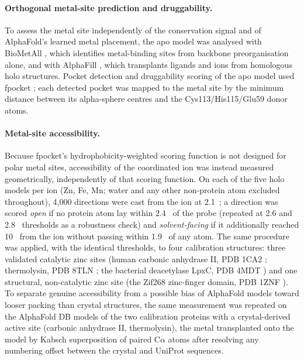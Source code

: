 \documentclass[11pt,a4paper]{article}
\newcommand{\ang}{\text{\AA}}
\begin{document}
\paragraph{Orthogonal metal-site prediction and druggability.} To assess the metal site independently of the conservation signal and of AlphaFold's learned metal placement, the apo model was analysed with BioMetAll \citep{sanchezaparicio2021biometall}, which identifies metal-binding sites from backbone preorganisation alone, and with AlphaFill \citep{hekkelman2023alphafill}, which transplants ligands and ions from homologous holo structures. Pocket detection and druggability scoring of the apo model used fpocket \citep{leguilloux2009fpocket}; each detected pocket was mapped to the metal site by the minimum distance between its alpha-sphere centres and the Cys113/His115/Glu59 donor atoms.

\paragraph{Metal-site accessibility.} Because fpocket's hydrophobicity-weighted scoring function is not designed for polar metal sites, accessibility of the coordinated ion was instead measured geometrically, independently of that scoring function. On each of the five holo models per ion (Zn, Fe, Mn; water and any other non-protein atom excluded throughout), 4{,}000 directions were cast from the ion at 2.1~\ang{}; a direction was scored \emph{open} if no protein atom lay within 2.4~\ang{} of the probe (repeated at 2.6 and 2.8~\ang{} thresholds as a robustness check) and \emph{solvent-facing} if it additionally reached 10~\ang{} from the ion without passing within 1.9~\ang{} of any atom. The same procedure was applied, with the identical thresholds, to four calibration structures: three validated catalytic zinc sites (human carbonic anhydrase II, PDB 1CA2 \citep{eriksson1988carbonicanhydrase}; thermolysin, PDB 8TLN \citep{holland1992thermolysin}; the bacterial deacetylase LpxC, PDB 4MDT \citep{clayton2013lpxc}) and one structural, non-catalytic zinc site (the Zif268 zinc-finger domain, PDB 1ZNF \citep{lee1989zincfinger}). To separate genuine accessibility from a possible bias of AlphaFold models toward looser packing than crystal structures, the same measurement was repeated on the AlphaFold DB models of the two calibration proteins with a crystal-derived active site (carbonic anhydrase II, thermolysin), the metal transplanted onto the model by Kabsch superposition of paired C$\alpha$ atoms after resolving any numbering offset between the crystal and UniProt sequences.
\end{document}
